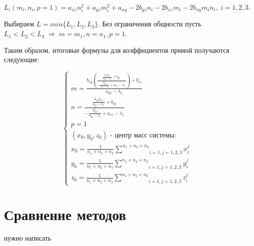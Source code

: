 \documentclass[article,final,14pt]{scrreprt}
\begin{document}
\begin{center}
	$L_i (m_i, n_i, p = 1)= a_{xz} n_i^2 + a_{yz} m_i^2 + a_{xy} - 2 b_{yz} n_i - 2 b_{xz} m_i  - 2 b_{xy} m_i n_i, \;i=1,2,3.$
\end{center}

Выбираем $L = min \{L_1, L_2, L_3\}$. Без ограничения общности пусть $L_1 < L_2 < L_3 \; \Rightarrow \; m = m_1, n = n_1, p = 1$.

Таким образом, итоговые формулы для коэффициентов прмяой получаются следующие:

$$\begin{cases}
	m = \frac{b_{xy} \left(\frac{\frac{b_{xy} b_{xz}}{a_{yz} - \lambda_1} + b_{yz}}{- \frac{b_{xy}^2}{a_{yz} - \lambda_1} + a_{xz} - \lambda_1}\right) + b_{xz}}{a_{yz} - \lambda_1} \\
	n = \frac{\frac{b_{xy} b_{xz}}{a_{yz} - \lambda_1} + b_{yz}}{- \frac{b_{xy}^2}{a_{yz} - \lambda_1} + a_{xz} - \lambda_1} \\
	p = 1 \\
	(x_0, y_0, z_0)\text{ - центр масс системы:} \\
	x_0 = \frac{1}{n_1+n_2+n_3}\underset{i=1, j=1,2,3}{\overset{n_1+n_2+n_3}{\sum}}x_i^j \\
	y_0 = \frac{1}{n_1+n_2+n_3}\underset{i=1, j=1,2,3}{\overset{n_1+n_2+n_3}{\sum}}y_i^j \\
	z_0 = \frac{1}{n_1+n_2+n_3}\underset{i=1, j=1,2,3}{\overset{n_1+n_2+n_3}{\sum}}z_i^j
\end{cases}$$

\chapter{Сравнение методов}

нужно написать
\end{document}
